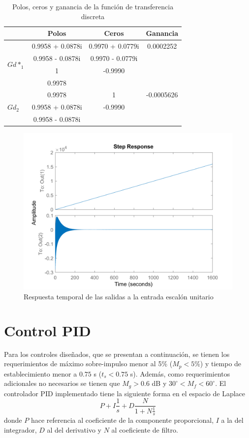 \documentclass[journal]{IEEEtran}
\begin{document}
\begin{table}[!h]
\centering
\caption{Polos, ceros y ganancia de la función de transferencia discreta}
\label{tab: pzg tfdd}
\begin{tabular}{@{}lccc@{}}
\toprule
                  & Polos & Ceros             & Ganancia          \\ \midrule
\multirow{4}{*}{$Gd*_1$} & 0.9958 + 0.0878i &  0.9970 + 0.0779i & 0.0002252 \\
                  & 0.9958 - 0.0878i & 0.9970 - 0.0779i &                   \\
                  & 1 & -0.9990  &                   \\
                  & 0.9978 & &                   \\    
                 \midrule
\multirow{4}{*}{$Gd_2$} &  0.9978 & 1 & -0.0005626 \\
                  & 0.9958 + 0.0878i & -0.9990 &                   \\  
                  &  0.9958 - 0.0878i &  &
                  \\ \bottomrule
\end{tabular}
\end{table}

\begin{figure}[!h]
\caption{Respuesta temporal de las salidas a la entrada escalón unitario\label{fig:stepGdd}}
  \centering
\includegraphics[scale=0.18]{Bode/stepGdd.png}
\end{figure}



\section{Control PID}
Para los controles diseñados, que se presentan a continuación, se tienen los requerimientos de máximo sobre-impulso menor al 5\% ($M_p<5\%$) y tiempo de establecimiento menor a $0.75$ s ($t_s<0.75$ s). Además, como requerimientos adicionales no necesarios se tienen que $M_g>0.6$ dB y $30^{\circ}<M_f<60^{\circ}$. El controlador PID implementado tiene la siguiente forma en el espacio de Laplace
$$P+I\frac{1}{s}+D\frac{N}{1+N\frac{1}{s}}$$
donde $P$ hace referencia al coeficiente de la componente proporcional, $I$ a la del integrador, $D$ al del derivativo y $N$ al coeficiente de filtro.
\end{document}
